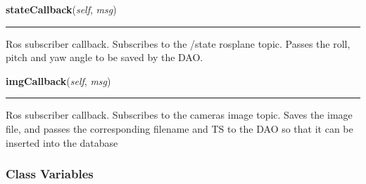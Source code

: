     \label{src:ros_ingest:RosIngester:stateCallback}

    \vspace{0.5ex}

\hspace{.8\funcindent}\begin{boxedminipage}{\funcwidth}

    \raggedright \textbf{stateCallback}(\textit{self}, \textit{msg})

    \vspace{-1.5ex}

    \rule{\textwidth}{0.5\fboxrule}
\setlength{\parskip}{2ex}
    Ros subscriber callback. Subscribes to the /state rosplane topic. 
    Passes the roll, pitch and yaw angle to be saved by the DAO.

\setlength{\parskip}{1ex}
    \end{boxedminipage}

    \label{src:ros_ingest:RosIngester:imgCallback}

    \vspace{0.5ex}

\hspace{.8\funcindent}\begin{boxedminipage}{\funcwidth}

    \raggedright \textbf{imgCallback}(\textit{self}, \textit{msg})

    \vspace{-1.5ex}

    \rule{\textwidth}{0.5\fboxrule}
\setlength{\parskip}{2ex}
    Ros subscriber callback. Subscribes to the cameras image topic. Saves 
    the image file, and passes the corresponding filename and TS to the DAO
    so that it can be inserted into the database

\setlength{\parskip}{1ex}
    \end{boxedminipage}



  \subsubsection{Class Variables}

